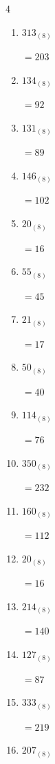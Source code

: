 \begin{multicols}{4}
\begin{enumerate}
        $=44$

  \item $313_{(8)}$

        $=203$

  \item $134_{(8)}$

        $=92$

  \item $131_{(8)}$

        $=89$

  \item $146_{(8)}$

        $=102$

  \item $20_{(8)}$

        $=16$

  \item $55_{(8)}$

        $=45$

  \item $21_{(8)}$

        $=17$

  \item $50_{(8)}$

        $=40$

  \item $114_{(8)}$

        $=76$

  \item $350_{(8)}$

        $=232$

  \item $160_{(8)}$

        $=112$

  \item $20_{(8)}$

        $=16$

  \item $214_{(8)}$

        $=140$

\columnbreak %

\resetques

  \item $127_{(8)}$

        $=87$

  \item $333_{(8)}$

        $=219$

  \item $207_{(8)}$


\end{enumerate}
\end{multicols}
